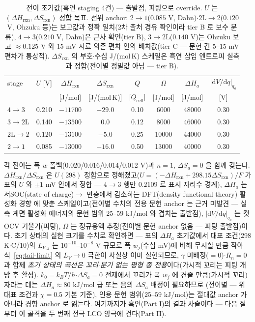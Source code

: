 \documentclass[11pt,a4paper]{article}
\newcommand{\dd}{\mathrm{d}}
\newcommand{\cell}{\mathrm{cell}}
\newcommand{\rxn}{\mathrm{rxn}}
\begin{document}
\begin{table}[t]
\centering\footnotesize
\renewcommand{\arraystretch}{1.3}
\caption{전이 초기값(흑연 staging 4건) — 출발점, 피팅으로 override. $U$ 는 $(\Delta H_\rxn,\Delta S_\rxn)$
정합 목표. 전위 anchor: $2\!\to\!1$($0.085$ V, Dahn\cite{dahn1991})$\cdot$$2\mathrm
L\!\to\!2$($0.120$ V, Ohzuku 등\cite{ohzuku1993})는 보고값과 정확 일치(2차 출처 경유 확인이라 tier B 로
보수 분류), $4\!\to\!3$($0.210$ V, Dahn\cite{dahn1991})은 근사 확인(tier B),
$3\!\to\!2\mathrm L$($0.140$ V)는 Ohzuku 보고 $\approx0.125$ V 와 $15$ mV 시료 의존
편차 안의 배치값(tier C — 문헌 간 $5$--$15$ mV 편차가 통상적). $\Delta S_\rxn$ 의 부호$\cdot$수십
J/(mol\,K) 스케일은 흑연 삽입 엔트로피 실측\cite{reynier2003} 과 정합(전이별 정밀값 아님 — tier B).}
\label{tab:staging}
\begin{tabular}{l c c c c c c c}
\toprule
stage & $U$ [V] & $\Delta H_\rxn$ & $\Delta S_\rxn$ & $Q$ & $\Omega$ & $\Delta H_a$ & $|\dd V/\dd q|_{q_a}$ \\
 &  & [J/mol] & [J/(mol\,K)] & [$Q_\cell$] & [J/mol] & [J/mol] & [V] \\
\midrule
$4\!\to\!3$   & 0.210 & $-11700$ & $+29.0$ & 0.10 & 6000  & 48000 & 0.30 \\
$3\!\to\!2\mathrm L$ & 0.140 & $-13500$ & $0.0$   & 0.12 & 8000  & 46000 & 0.30 \\
$2\mathrm L\!\to\!2$ & 0.120 & $-13100$ & $-5.0$  & 0.25 & 10000 & 44000 & 0.30 \\
$2\!\to\!1$   & 0.085 & $-13000$ & $-16.0$ & 0.50 & 13000 & 40000 & 0.30 \\
\bottomrule
\end{tabular}
\end{table}

각 전이는 폭 $w$ 폴백(0.020/0.016/0.014/0.012 V)과 $n=1$, $\Delta S_a=0$ 을 함께 갖는다. $\Delta H_\rxn/\Delta S_\rxn$
은 $U(298)$ 정합으로 정해졌고($U=(-\Delta H_\rxn+298.15\Delta S_\rxn)/F$ 가 표의 $U$ 와 $\pm1$ mV 안에서 정합 — $4\!\to\!3$ 행만 $0.2109$ 로 표시 자리수 경계), $\Delta H_a$ 는 저SOC(state of charge)$\to$
만충에서 감소하는 DFT(density functional theory) 활성화 경향\cite{persson2010,persson2010b} 에 맞춘
스케일이고(전이별 수치의 전용 문헌 anchor 는 근거 미발견 — 실측 계면 활성화 에너지의 문헌 범위
$25$--$59$ kJ/mol 와 겹치는 출발점), $|\dd V/\dd q|_{q_a}$ 는 컷 OCV 기울기(피팅), $\Omega$ 는 정규용액
추정(전이별 문헌 anchor 없음 — 피팅 출발점)이다.
초기 상태의 실현 크기를 수치로 확인하면 --- 표의 $\Delta H_a$ 초기값에서 대표 조건(298 K$\cdot$C/10)의
$L_{V,j}$ 는 $10^{-10}$--$10^{-8}$ V 규모로 폭 $w_j$(수십 mV)에 비해 무시할 만큼 작아 식~\eqref{eq:tail-limit} 의 $L_V\to0$ 극한이 사실상 이미 실현되므로, $\gamma$ 미배정($=0$)$\cdot$$R_n=0$ 과 함께 \emph{초기 상태의 곡선은 꼬리$\cdot$분기 없는 평형
종 전용}이다(가시적 꼬리는 피팅 개방 후 활성). $k_0=k_BT/h$$\cdot$$\Delta S_a{=}0$ 전제에서 꼬리가
폭 $w_j$ 에 견줄 만큼(가시적 꼬리) 자라는 데는 $\Delta H_a\approx80$ kJ/mol 급 또는 음의 $\Delta S_a$ 배정이 필요하므로
(전이별 --- 위 대표 조건과 $\chi=0.5$ 기본 기준), 인용 문헌
범위($25$--$59$ kJ/mol)는 절대값 anchor 가 아니라 경향 anchor 로 읽는다.
여기까지가 흑연(Part I)의 결과 사슬이다 — 다음 절부터 이 골격을 두 번째 전극 LCO 양극에 건다(Part II).
\end{document}
